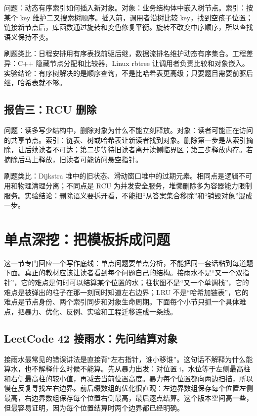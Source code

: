 问题：动态有序索引如何插入新对象。对象：业务结构体中嵌入树节点。索引：按某个 key 维护二叉搜索树顺序。插入前，调用者沿树比较 key，找到空孩子位置；链接新节点后，库函数通过旋转和变色修复平衡。旋转不改变中序顺序，所以查找语义保持不变。

刷题类比：日程安排用有序表找前驱后继，数据流排名维护动态有序集合。工程差异：C++  隐藏节点分配和比较器，Linux rbtree 让调用者负责比较和对象嵌入。实验结论：有序树解决的是顺序查询，不是比哈希表更高级；只要题目需要前驱后继，哈希表就不够。

\subsection{报告三：RCU 删除}

问题：读多写少结构中，删除对象为什么不能立刻释放。对象：读者可能正在访问的共享节点。索引：链表、树或哈希表让新读者找到对象。删除第一步是从索引摘除，让后续读者不可达；第二步等待旧读者离开读侧临界区；第三步释放内存。若摘除后马上释放，旧读者可能访问悬空指针。

刷题类比：Dijkstra 堆中的旧状态、滑动窗口堆中的过期元素。相同点是逻辑不可用和物理清理分离；不同点是 RCU 为并发安全服务，堆懒删除多为容器能力限制服务。实验结论：删除语义要拆开看，不能把“从答案集合移除”和“销毁对象”混成一步。

\section{单点深挖：把模板拆成问题}

这一节专门回应一个写作底线：单点问题要单点分析，不能把同一套话粘到每道题下面。真正的教材应该让读者看到每个问题自己的结构。接雨水不是“又一个双指针”，它的难点是何时可以结算某个位置的水；柱状图不是“又一个单调栈”，它的难点是被弹出的柱子在那一刻同时知道左右边界；LRU 不是“哈希加链表”，它的难点是节点身份、两个索引同步和对象生命周期。下面每个小节只抓一个具体难点，把暴力、优化、反例、实验和工程迁移连成一条线。

\subsection{LeetCode 42 接雨水：先问结算对象}

接雨水最常见的错误讲法是直接背“左右指针，谁小移谁”。这句话不解释为什么能算水，也不解释什么时候不能算。先从暴力出发：对位置 i，水位等于左侧最高柱和右侧最高柱的较小值，再减去当前位置高度。暴力每个位置都向两边扫描，所以慢在反复寻找左右边界。前后缀数组的优化很直观：左边界数组保存每个位置左侧最高，右边界数组保存每个位置右侧最高，最后逐点结算。这个版本空间高一些，但最容易证明，因为每个位置结算时两个边界都已经明确。

